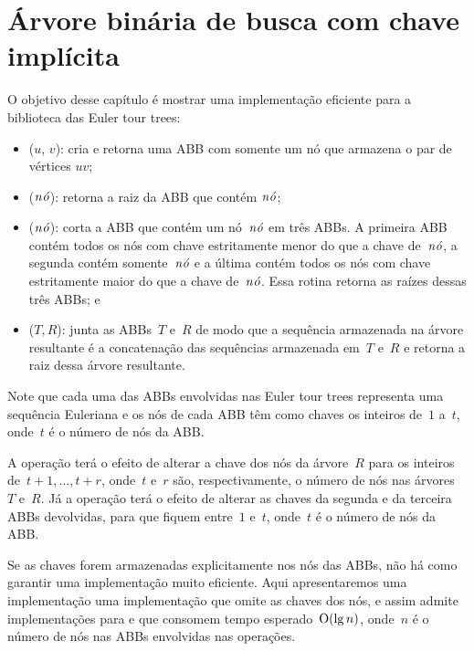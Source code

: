 \chapter{Árvore binária de busca com chave implícita}
\label{sec:TreapDeChaveImplicita}

O objetivo desse capítulo é mostrar uma implementação eficiente para a biblioteca das Euler tour trees:
\begin{itemize}
\item  \treapCreate($u$, $v$): cria e retorna uma ABB com somente um nó que armazena o par de vértices $uv$;
\item \treapGetRoot($\mathit{n\acute{o}}$): retorna a raiz da ABB que contém $\mathit{n\acute{o}}$;
\item \treapSplit($\mathit{n\acute{o}}$): corta a ABB que contém um nó~$\mathit{n\acute{o}}$ em três ABBs. A primeira ABB contém todos os nós com chave estritamente menor do que a chave de~$\mathit{n\acute{o}}$, a segunda contém somente~$\mathit{n\acute{o}}$ e a última contém todos os nós com chave estritamente maior do que a chave de~$\mathit{n\acute{o}}$. Essa rotina retorna as raízes dessas três ABBs; e
\item \treapJoin($T, R$): junta as ABBs~$T$ e~$R$ de modo que a sequência armazenada na árvore resultante é a concatenação das sequências armazenada em~$T$ e~$R$ e retorna a raiz dessa árvore resultante.
\end{itemize}

Note que cada uma das ABBs envolvidas nas Euler tour trees representa uma sequência Euleriana e os nós de cada ABB têm como chaves os inteiros de~$1$ a~$t$, onde~$t$ é o número de nós da ABB.

A operação \treapJoin{} terá o efeito de alterar a chave dos nós da árvore~$R$ para os inteiros de~$t+1,\ldots,t+r$, onde~$t$ e~$r$ são, respectivamente, o número de nós nas árvores~$T$ e~$R$.
Já a operação \treapSplit{} terá o efeito de alterar as chaves da segunda e da terceira ABBs devolvidas, para que fiquem entre~$1$ e~$t$, onde~$t$ é o número de nós da ABB.

Se as chaves forem armazenadas explicitamente nos nós das ABBs, não há como garantir uma implementação muito eficiente.
Aqui apresentaremos uma implementação uma implementação que omite as chaves dos nós, e assim admite implementações para \treapJoin{} e \treapSplit{} que consomem tempo esperado~$\mathrm{O}(\lg n)$, onde~$n$ é o número de nós nas ABBs envolvidas nas operações.

